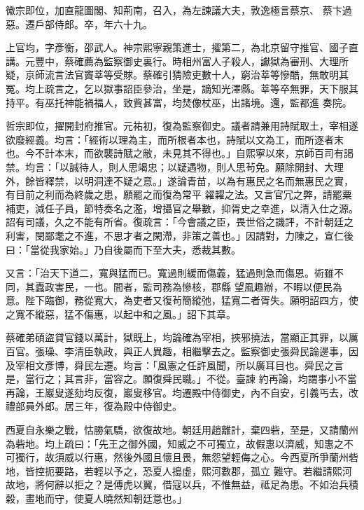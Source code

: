 \begin{pinyinscope}
 徽宗即位，加直龍圖閣、知荊南，召入，為左諫議大夫，敦逸極言蔡京、
 蔡卞過惡。遷戶部侍郎。卒，年六十九。



 上官均，字彥衡，邵武人。神宗熙寧親策進士，擢第二，為北京留守推官、國子直講。元豐中，蔡確薦為監察御史裏行。時相州富人子殺人，讞獄為審刑、大理所疑，京師流言法官竇莘等受賕。蔡確引猜險吏數十人，窮治莘等慘酷，無敢明其冤。均上疏言之，乞以獄事詔臣參治，坐是，謫知光澤縣。莘等卒無罪，天下服其持平。有巫托神能禍福人，致貲甚富，均焚像杖巫，出諸境。還，監都進
 奏院。



 哲宗即位，擢開封府推官。元祐初，復為監察御史。議者請兼用詩賦取土，宰相遂欲廢經義。均言：「經術以理為主，而所根者本也，詩賦以文為工，而所逐者末也。今不計本末，而欲襲詩賦之敝，未見其不得也。」自熙寧以來，京師百司有謁禁。均言：「以誠待人，則人思竭忠；以疑遇物，則人思茍免。願除開封、大理外，餘皆釋禁，以明洞達不疑之意。」遂論青苗，以為有惠民之名而無惠民之實，有目前之利而為終歲之患，願罷之而復為常平
 糴糶之法。又言官冗之弊，請罷粟補吏，減任子員，節特奏名之濫，增攝官之舉數，抑胥史之幸進，以清入仕之源。詔有司議，久之不能有所省。復疏言：「今會議之臣，畏世俗之譏評，不計朝廷之利害，閔鄙耄之不進，不思才者之閑滯，非策之善也。」因請對，力陳之，宣仁後曰：「當從我家始。」乃自後屬而下至大夫，悉裁其數。



 又言：「治天下道二，寬與猛而已。寬過則緩而傷義，猛過則急而傷恩。術雖不同，其蠹政害民，一也。間者，監司務為慘核，郡縣
 望風趣辦，不暇以便民為意。陛下臨御，務從寬大，為吏者又復茍簡縱弛，猛寬二者胥失。願明詔四方，使之寬不縱惡，猛不傷惠，以起中和之風。」詔下其章。



 蔡確弟碩盜貸官錢以萬計，獄既上，均論確為宰相，挾邪撓法，當顯正其罪，以厲百官。張璪、李清臣執政，與正人異趣，相繼擊去之。監察御史張舜民論邊事，因及宰相文彥博，舜民左遷。均言：「風憲之任許風聞，所以廣耳目也。舜民之言是，當行之；其言非，當容之。願復舜民職。」不從。臺諫
 約再論，均謂事小不當再論，王巖叟遂劾均反復，巖叟移官。均遷殿中侍御史，內不自安，引義丐去，改禮部員外郎。居三年，復為殿中侍御史。



 西夏自永樂之戰，怙勝氣驕，欲復故地。朝廷用趙離計，棄四砦，至是，又請蘭州為砦地。均上疏曰：「先王之御外國，知威之不可獨立，故假惠以濟威，知惠之不可獨行，故須威以行惠，然後外國且懷且畏，無怨望輕侮之心。今西夏所爭蘭州砦地，皆控扼要路，若輕以予之，恐夏人搗虛，熙河數郡，孤立
 難守。若繼請熙河故地，將何辭以拒之？是傅虎以翼，借寇以兵，不惟無益，祗足為患。不如治兵積穀，畫地而守，使夏人曉然知朝廷意也。」




\end{pinyinscope}
